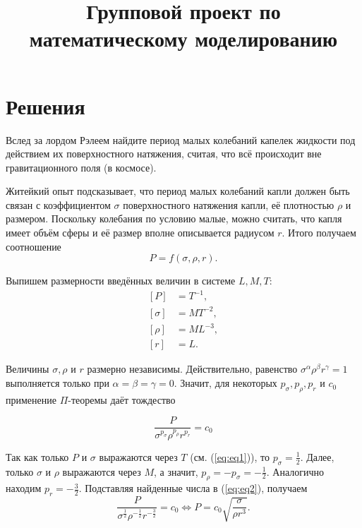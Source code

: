 


\title{Групповой проект по математическому моделированию}
\author{}
\date{}


\maketitle

\tableofcontents

\section{Решения}

 Вслед за лордом Рэлеем найдите период малых колебаний капелек жидкости под действием их поверхностного натяжения, считая, что всё происходит вне гравитационного поля (в космосе).\par

Житейкий опыт подсказывает, что период малых колебаний капли должен быть связан с коэффициентом $\sigma$ поверхностного натяжения капли, её плотностью $\rho$ и размером. Поскольку колебания по условию малые, можно считать, что капля имеет объём сферы и её размер вполне описывается радиусом $r$. Итого получаем соотношение
\[ P = f(\sigma, \rho, r). \]

Выпишем размерности введённых величин в системе $L, M, T$:
\begin{equation} \label{eq:eq1}
\begin{split}
[P] & = T^{-1},\\
[\sigma] & = MT^{-2},\\
[\rho] & = ML^{-3},\\
[r] & = L.
\end{split}
\end{equation}

Величины $\sigma, \rho$ и $r$ размерно независимы. Действительно, равенство $\sigma ^\alpha \rho ^\beta r^\gamma =1$ выполняется только при $\alpha = \beta = \gamma = 0$. Значит, для некоторых $p_\sigma, p_\rho, p_r$ и $c_0$ применение $\Pi$-теоремы даёт тождество

\begin{equation} \label{eq:eq2}
\dfrac{P}{\sigma ^{p_\sigma} \rho ^{p_\rho} r^{p_r}} = c_0 
\end{equation}

Так как только $P$ и $\sigma$ выражаются через $T$ (см. (\ref{eq:eq1})), то $p_\sigma = \frac{1}{2}$. Далее, только $\sigma$ и $\rho$ выражаются через 
$M$, а значит, $p_\rho = -p_\sigma = -\frac{1}{2}$. Аналогично находим $p_r = -\frac{3}{2}$. Подставляя найденные числа в (\ref{eq:eq2}), получаем
\[
\dfrac{P}{\sigma ^{\frac{1}{2}} \rho ^{-\frac{1}{2}} r^{-\frac{3}{2}}} = c_0 \iff 
P = c_0 \sqrt{ \dfrac{\sigma}{\rho r^3} }.
\]

